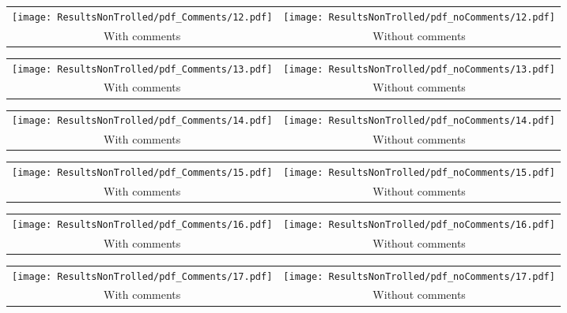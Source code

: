 \begin{tabular}{cc}
{  \texttt{[image: ResultsNonTrolled/pdf\_Comments/12.pdf]} } & 
{  \texttt{[image: ResultsNonTrolled/pdf\_noComments/12.pdf]}} \\
 With comments & Without comments \\
\end{tabular}

\begin{tabular}{cc}
{  \texttt{[image: ResultsNonTrolled/pdf\_Comments/13.pdf]} } & 
{  \texttt{[image: ResultsNonTrolled/pdf\_noComments/13.pdf]}} \\
 With comments & Without comments \\
\end{tabular}

\begin{tabular}{cc}
{  \texttt{[image: ResultsNonTrolled/pdf\_Comments/14.pdf]} } & 
{  \texttt{[image: ResultsNonTrolled/pdf\_noComments/14.pdf]}} \\
 With comments & Without comments \\
\end{tabular}

\begin{tabular}{cc}
{  \texttt{[image: ResultsNonTrolled/pdf\_Comments/15.pdf]} } & 
{  \texttt{[image: ResultsNonTrolled/pdf\_noComments/15.pdf]}} \\
 With comments & Without comments \\
\end{tabular}

\begin{tabular}{cc}
{  \texttt{[image: ResultsNonTrolled/pdf\_Comments/16.pdf]} } & 
{  \texttt{[image: ResultsNonTrolled/pdf\_noComments/16.pdf]}} \\
 With comments & Without comments \\
\end{tabular}

\begin{tabular}{cc}
{  \texttt{[image: ResultsNonTrolled/pdf\_Comments/17.pdf]} } & 
{  \texttt{[image: ResultsNonTrolled/pdf\_noComments/17.pdf]}} \\
 With comments & Without comments \\
\end{tabular}

